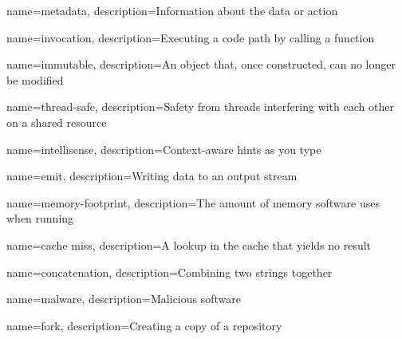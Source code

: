 {
	name={metadata},
	description={Information about the data or action}
}

{
	name={invocation},
	description={Executing a code path by calling a function}
}



{
	name={immutable},
	description={An object that, once constructed, can no longer be modified}
}

{
	name={thread-safe},
	description={Safety from threads interfering with each other on a shared resource}
}

{
	name={intellisense},
	description={Context-aware hints as you type}
}


{
	name={emit},
	description={Writing data to an output stream}
}

{
	name={memory-footprint},
	description={The amount of memory software uses when running}
}



{
	name={cache miss},
	description={A lookup in the cache that yields no result}
}

{
	name={concatenation},
	description={Combining two strings together}
}


{
	name={malware},
	description={Malicious software}
}


{
	name={fork},
	description={Creating a copy of a repository}
}